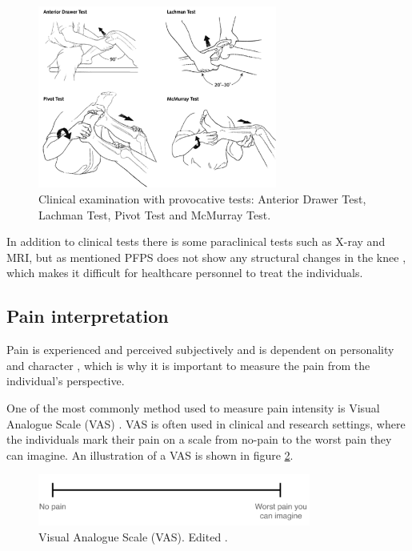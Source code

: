 \begin{figure} [H]
\centering
\includegraphics[width=0.7\textwidth]{figures/kneetest}
\caption{Clinical examination with provocative tests: Anterior Drawer Test, Lachman Test, Pivot Test and McMurray Test.\citep{Ghosh2010}}
\label{fig:kneetest}
\end{figure}


\noindent
In addition to clinical tests there is some paraclinical tests such as X-ray and MRI, but as mentioned PFPS does not show any structural changes in the knee \citep{Petersen2013}, which makes it difficult for healthcare personnel to treat the individuals. 

\subsection{Pain interpretation}
Pain is experienced and perceived subjectively \citep{IASP2012, Younger2009} and is dependent on personality and character \citep{Schmidt2013}, which is why it is important to measure the pain from the individual’s perspective.
 
\noindent
One of the most commonly method used to measure pain intensity is Visual Analogue Scale (VAS) \citep{Valente2011}. VAS is often used in clinical and research settings, where the individuals mark their pain on a scale from no-pain to the worst pain they can imagine.\citep{Haefeli2005} An illustration of a VAS is shown in figure \ref{fig:VAS}.

\begin{figure} [H]
\centering
\includegraphics[width=0.8\textwidth]{figures/VAS}
\caption{Visual Analogue Scale (VAS). Edited \citep{Haefeli2005}.}
\label{fig:VAS}
\end{figure}

